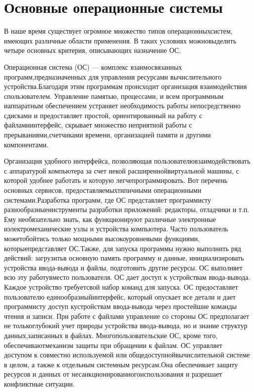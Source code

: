 \section{Основные операционные системы}

В наше время существует огромное множество типов операционныхсистем, имеющих различные области применения. В таких условиях можновыделить четыре основных критерия, описывающих назначение ОС.

Операционная система (ОС) — комплекс взаимосвязанных программ,предназначенных   для   управления   ресурсами   вычислительного   устройства.Благодаря   этим   программам   происходит   организация   взаимодействия   спользователем.  Управление   памятью,   процессами,   и   всем   программным   иаппаратным обеспечением устраняет необходимость работы непосредственно сдисками и предоставляет простой, ориентированный на работу с файламиинтерфейс,   скрывает   множество   неприятной   работы   с   прерываниями,счетчиками времени, организацией памяти и другими компонентами.~\cite{Oc1}

Организация   удобного   интерфейса,   позволяющая   пользователювзаимодействовать   с  аппаратурой   компьютера   за   счет   некой   расширеннойвиртуальной   машины,   с   которой   удобнее   работать   и   которую   легчепрограммировать.   Вот   перечень   основных   сервисов,   предоставляемыхтипичными операционными системами.Разработка программ, где ОС представляет программисту разнообразныеинструменты разработки приложений: редакторы, отладчики и т.п. Ему необязательно   знать,   как   функционируют   различные   электронные   иэлектромеханические узлы и устройства компьютера. Часто пользователь можетобойтись   только   мощными   высокоуровневыми   функциями,   которыепредставляет ОС.Также, для запуска программы нужно выполнить ряд действий: загрузитьв основную память программу и данные, инициализировать устройства ввода-вывода и файлы, подготовить другие ресурсы. ОС выполняет всю эту работувместо пользователя. ОС дает доступ к устройствам ввода-вывода. Каждое устройство требуетсвой набор команд для запуска. ОС предоставляет пользователю единообразныйинтерфейс,   который   опускает   все   детали   и   дает   программисту   доступ   кустройствам ввода-вывода через простейшие команды чтения и записи. При работе с файлами управление со стороны ОС предполагает не толькоглубокий учет природы устройства ввода-вывода, но и знание структур данных,записанных в файлах. Многопользовательские ОС, кроме того, обеспечиваютмеханизм защиты при обращении к файлам. ОС управляет доступом к совместно используемой или общедоступнойвычислительной системе в целом, а также к отдельным системным ресурсам.Она   обеспечивает   защиту   ресурсов   и   данных   от   несанкционированногоиспользования и разрешает конфликтные ситуации.

